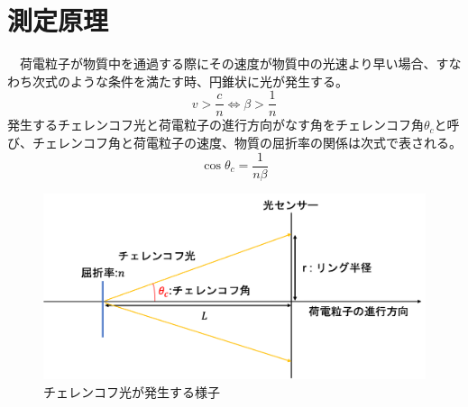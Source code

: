 \documentclass[uplatex, titlepage, dvipdfmx, 12pt, a4paper]{jsreport}
\begin{document}
\section{測定原理}
　荷電粒子が物質中を通過する際にその速度が物質中の光速より早い場合、すなわち次式のような条件を満たす時、円錐状に光が発生する。
\begin{equation}
v > \frac{c}{n} \Leftrightarrow \beta > \frac{1}{n} 
\end{equation}
発生するチェレンコフ光と荷電粒子の進行方向がなす角をチェレンコフ角$\theta_c$と呼び、チェレンコフ角と荷電粒子の速度、物質の屈折率の関係は次式で表される。
\begin{equation}
\cos \theta_c = \frac{1}{n\beta}
\label{cherenkov}
\end{equation}
\begin{figure}[h]
  \begin{center} 
    \includegraphics[clip, scale=0.5]{image/cherenkov.png}
    \caption{チェレンコフ光が発生する様子} 
    \label{fig:cherenkov} 
  \end{center}
\end{figure}
\end{document}
